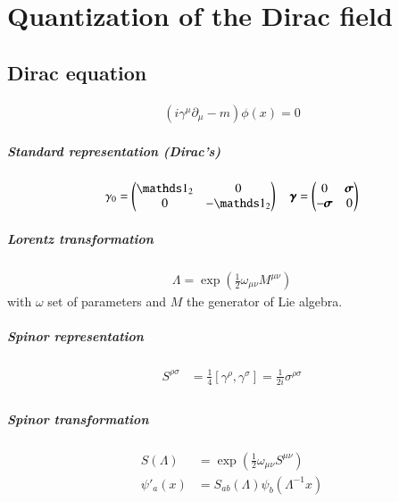 \chapter{Quantization of the Dirac field}
\setcounter{chapter}{3}
\section{Dirac equation}
\begin{align}
	\left(i \gamma^\mu \partial_\mu - m \right) \phi(x) = 0
\end{align}
\paragraph{Standard representation (Dirac's)}
\begin{align}
	\gamma_0 = \begin{pmatrix} \id_2 & 0 \\ 0 & -\id_2 \end{pmatrix}
	\quad
	\pmb{\gamma} = \begin{pmatrix} 0 & \pmb{\sigma} \\ -\pmb{\sigma} & 0 \end{pmatrix}
\end{align}
\paragraph{Lorentz transformation}
\begin{align}
	\Lambda = \exp(\frac{1}{2}\omega_{\mu\nu}M^{\mu\nu})
\end{align}
with $\omega$ set of parameters and $M$ the generator of Lie algebra.
\paragraph{Spinor representation}
\begin{align}
	S^{\rho\sigma} &= \frac{1}{4} \left[ \gamma^\rho, \gamma^\sigma \right] = \frac{1}{2i}\sigma^{\rho\sigma} \\
\end{align}
\paragraph{Spinor transformation}
\begin{align}
	S(\Lambda) &= \exp(\frac{1}{2} \omega_{\mu\nu}S^{\mu\nu}) \\
	\psi'_a(x) &= S_{ab}(\Lambda) \psi_b(\Lambda^{-1}x)
\end{align}
